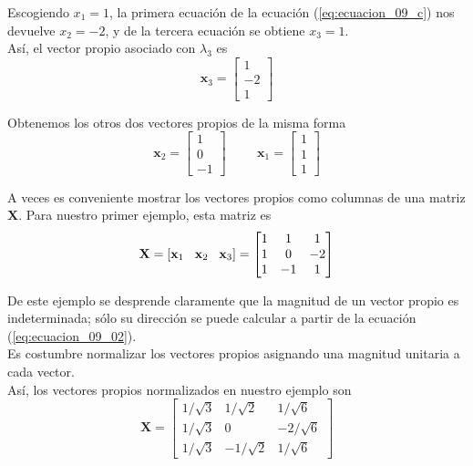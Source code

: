 \begin{frame}
Escogiendo $x_{1} = 1$, la primera ecuación de la ecuación (\ref{eq:ecuacion_09_c}) nos devuelve $x_{2} = -2$, y de la tercera ecuación se obtiene $x_{3} = 1$. 
\\
\bigskip
Así, el vector propio asociado con $\lambda_{3}$ es
\[ \mathbf{x}_{3}  = \begin{bmatrix}
1 \\
-2 \\
1
\end{bmatrix} \]
\end{frame}
\begin{frame}
Obtenemos los otros dos vectores propios de la misma forma
\[ \mathbf{x}_{2} = \begin{bmatrix}
1 \\
0 \\
-1
\end{bmatrix} \hspace{1cm}
\mathbf{x}_{1} =  \begin{bmatrix}
1 \\
1 \\
1
\end{bmatrix} \]
\end{frame}
\begin{frame}
A veces es conveniente mostrar los vectores propios como columnas de una matriz $\mathbf{X}$. Para nuestro primer ejemplo, esta matriz es
\[ \mathbf{X} = \left[ \mathbf{x}_{1} \hspace{0.3cm} \mathbf{x}_{2} \hspace{0.3cm} \mathbf{x}_{3} \right] = 
\begin{bmatrix}
1 & 1 & 1 \\
1 & 0 & -2 \\
1 & -1 & 1
\end{bmatrix} \]
\end{frame}
\begin{frame}
De este ejemplo se desprende claramente que la magnitud de un vector propio es indeterminada; sólo su dirección se puede calcular a partir de la ecuación (\ref{eq:ecuacion_09_02}).
\\
\bigskip
Es costumbre normalizar los vectores propios asignando una magnitud unitaria a cada vector. 
\pause
\\
\medskip
Así, los vectores propios normalizados en nuestro ejemplo son
\[ \mathbf{X} = \begin{bmatrix}
1 / \sqrt{3} & 1 / \sqrt{2} & 1 / \sqrt{6} \\
1 / \sqrt{3} & 0 & -2 / \sqrt{6} \\
1 / \sqrt{3} & -1 / \sqrt{2} & 1 / \sqrt{6}
\end{bmatrix} \]
\end{frame}
